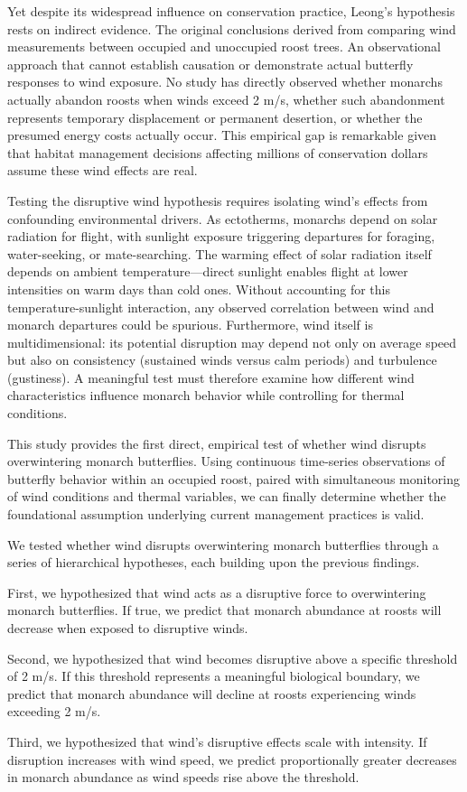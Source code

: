 Yet despite its widespread influence on conservation practice, Leong's hypothesis rests on indirect evidence. The original conclusions derived from comparing wind measurements between occupied and unoccupied roost trees. An observational approach that cannot establish causation or demonstrate actual butterfly responses to wind exposure. No study has directly observed whether monarchs actually abandon roosts when winds exceed 2 m/s, whether such abandonment represents temporary displacement or permanent desertion, or whether the presumed energy costs actually occur. This empirical gap is remarkable given that habitat management decisions affecting millions of conservation dollars assume these wind effects are real.

Testing the disruptive wind hypothesis requires isolating wind's effects from confounding environmental drivers. As ectotherms, monarchs depend on solar radiation for flight, with sunlight exposure triggering departures for foraging, water-seeking, or mate-searching. The warming effect of solar radiation itself depends on ambient temperature—direct sunlight enables flight at lower intensities on warm days than cold ones. Without accounting for this temperature-sunlight interaction, any observed correlation between wind and monarch departures could be spurious. Furthermore, wind itself is multidimensional: its potential disruption may depend not only on average speed but also on consistency (sustained winds versus calm periods) and turbulence (gustiness). A meaningful test must therefore examine how different wind characteristics influence monarch behavior while controlling for thermal conditions.

This study provides the first direct, empirical test of whether wind disrupts overwintering monarch butterflies. Using continuous time-series observations of butterfly behavior within an occupied roost, paired with simultaneous monitoring of wind conditions and thermal variables, we can finally determine whether the foundational assumption underlying current management practices is valid.

We tested whether wind disrupts overwintering monarch butterflies through a series of hierarchical hypotheses, each building upon the previous findings.

First, we hypothesized that wind acts as a disruptive force to overwintering monarch butterflies. If true, we predict that monarch abundance at roosts will decrease when exposed to disruptive winds.

Second, we hypothesized that wind becomes disruptive above a specific threshold of 2 m/s. If this threshold represents a meaningful biological boundary, we predict that monarch abundance will decline at roosts experiencing winds exceeding 2 m/s.

Third, we hypothesized that wind's disruptive effects scale with intensity. If disruption increases with wind speed, we predict proportionally greater decreases in monarch abundance as wind speeds rise above the threshold.